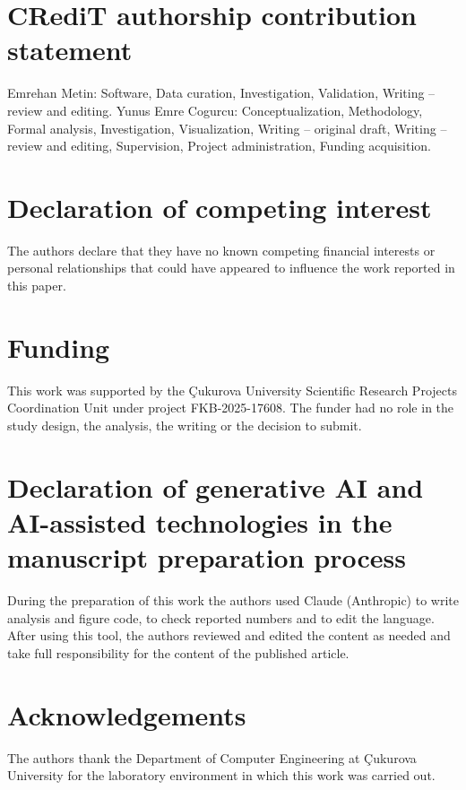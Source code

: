 \documentclass[preprint,12pt,authoryear]{elsarticle}
\begin{document}
\section*{CRediT authorship contribution statement}

Emrehan Metin: Software, Data curation, Investigation, Validation, Writing -- review and editing. Yunus Emre Cogurcu: Conceptualization, Methodology, Formal analysis, Investigation, Visualization, Writing -- original draft, Writing -- review and editing, Supervision, Project administration, Funding acquisition.

\section*{Declaration of competing interest}

The authors declare that they have no known competing financial interests or personal relationships that could have appeared to influence the work reported in this paper.

\section*{Funding}

This work was supported by the \c{C}ukurova University Scientific Research Projects Coordination Unit under project FKB-2025-17608. The funder had no role in the study design, the analysis, the writing or the decision to submit.

\section*{Declaration of generative AI and AI-assisted technologies in the manuscript preparation process}

During the preparation of this work the authors used Claude (Anthropic) to write analysis and figure code, to check reported numbers and to edit the language. After using this tool, the authors reviewed and edited the content as needed and take full responsibility for the content of the published article.

\section*{Acknowledgements}

The authors thank the Department of Computer Engineering at \c{C}ukurova University for the laboratory environment in which this work was carried out.



\end{document}
